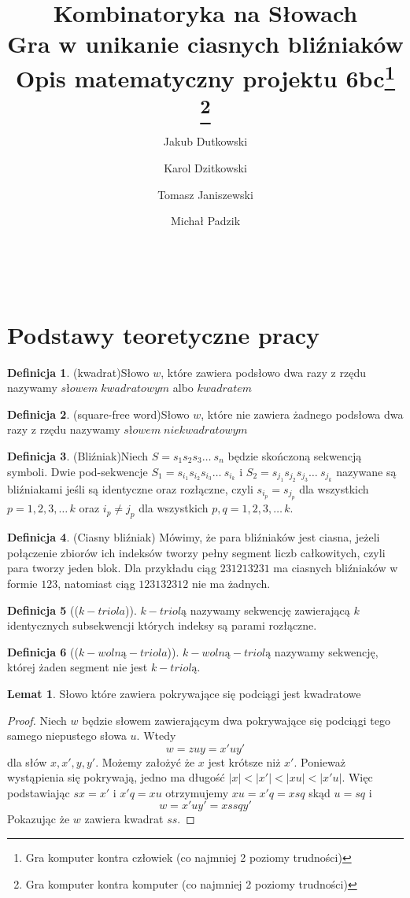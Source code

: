 \documentclass[11pt,a4paper]{article}
\author{Jakub Dutkowski}
\author{Karol Dzitkowski}
\author{Tomasz Janiszewski}
\author{Michał Padzik}
\affil{Wydział Matematyki i Nauk Informacyjnych, Politechnika Warszawska}
\title{
	Kombinatoryka na Słowach\\
	Gra w unikanie ciasnych bliźniaków\\
	Opis matematyczny projektu
	6bc\footnote{Gra komputer kontra człowiek (co najmniej 2 poziomy trudności)}
\footnote{Gra komputer kontra komputer (co najmniej 2 poziomy trudności)}
 }
\theoremstyle{definition}
\newtheorem{definition}{Definicja}[section]
\newtheorem{lemma}{Lemat}[section]
\begin{document}
\maketitle\
\newpage\

\section{Podstawy teoretyczne pracy}
\begin{definition}{(kwadrat)}\label{def:sqr-word}
Słowo $w$, które zawiera podsłowo dwa razy z rzędu
nazywamy $słowem\;kwadratowym$ albo $kwadratem$
\end{definition}
\begin{definition}{(square-free word)}\label{def:sqr-free-word}
Słowo $w$, które nie zawiera żadnego podsłowa dwa razy z rzędu
nazywamy $słowem\;niekwadratowym$
\end{definition}
\begin{definition}{(Bliźniak)}\label{def:blizniak}
Niech $S = s_1 s_2 s_3 \ldots\ s_n$ będzie skończoną sekwencją symboli. Dwie pod-sekwencje
$S_1 = s_{i_1} s_{i_2} s_{i_3} \ldots\ s_{i_k}$ i $S_2 = s_{j_1} s_{j_2} s_{j_3} \ldots\ s_{j_k}$
nazywane są bliźniakami jeśli są identyczne oraz rozłączne, czyli $s_{i_p} = s_{j_p}$ dla
wszystkich $p = {1, 2, 3, \ldots\, k}$ oraz $ i_p \neq j_p $ dla wszystkich $ p,q = {1, 2, 3, \ldots\, k}$.
\end{definition}
\begin{definition}{(Ciasny bliźniak)}
Mówimy, że para bliźniaków jest ciasna, jeżeli połączenie zbiorów ich indeksów tworzy pełny segment
liczb całkowitych, czyli para tworzy jeden blok. Dla przykładu ciąg $231213231$ ma ciasnych bliźniaków
w formie $123$, natomiast ciąg $123132312$ nie ma żadnych.
\end{definition}
\begin{definition}[($k-triola$)]\label{def:triola}
$k-triolą$ nazywamy sekwencję zawierającą $k$ identycznych subsekwencji
których indeksy są parami rozłączne.
\end{definition}
\begin{definition}[($k-wolną-triola$)]\label{def:triola}
$k-wolną-triolą$ nazywamy sekwencję, której żaden segment
nie jest $k-triolą$.
\end{definition}

\begin{lemma}\label{lemat:1}
Słowo które zawiera pokrywające się podciągi jest kwadratowe
\begin{proof}
Niech $w$ będzie słowem zawierającym dwa pokrywające się podciągi tego
samego niepustego słowa $u$.
Wtedy $$w = zuy = x'uy'$$ dla słów $x,x',y,y'$. Możemy założyć że $x$
jest krótsze niż $x'$. Ponieważ wystąpienia się pokrywają,
jedno ma długość $|x| < |x'| < |xu| < |x'u|$. Więc podstawiając
$sx = x'$ i $x'q = xu$ otrzymujemy $xu = x'q = xsq$
skąd $u =  sq$ i $$w = x'uy' = xssqy' $$
Pokazując że $w$ zawiera kwadrat $ss$.
\end{proof}
\end{lemma}
\end{document}
